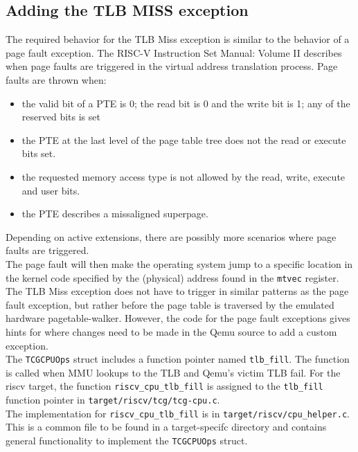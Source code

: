 \subsection{Adding the TLB MISS exception}
The required behavior for the TLB Miss exception is similar to the behavior of a page fault exception.
The RISC-V Instruction Set Manual: Volume II \cite{RISCVInstructionSetII} describes when page faults
are triggered in the virtual address translation process. Page faults are thrown when:
\begin{itemize}
    \item the valid bit of a PTE is 0; the read bit is 0 and the write bit is 1; any of the reserved
          bits is set
    \item the PTE at the last level of the page table tree does not the read or execute bits set.
    \item the requested memory access type is not allowed by the read, write, execute and user bits.
    \item the PTE describes a missaligned superpage.
\end{itemize}
Depending on active extensions, there are possibly more scenarios where page faults are triggered.\\
The page fault will then make the operating system jump to a specific location in the kernel code
specified by the (physical) address found in the \texttt{mtvec} register.\\
The TLB Miss exception does not have to trigger in similar patterns as the page fault exception, but rather
before the page table is traversed by the emulated hardware pagetable-walker.
However, the code for the page fault exceptions gives hints for where changes need to be made in the Qemu
source to add a custom exception.\\
The \texttt{TCGCPUOps} struct includes a function pointer named \texttt{tlb\_fill}. The function is called
when MMU lookups to the TLB and Qemu's victim TLB fail.
For the riscv target, the function \texttt{riscv\_cpu\_tlb\_fill} is assigned to the \texttt{tlb\_fill}
function pointer in \texttt{target/riscv/tcg/tcg-cpu.c}.\\
The implementation for \texttt{riscv\_cpu\_tlb\_fill} is in \texttt{target/riscv/cpu\_helper.c}. This is a common
file to be found in a target-specifc directory and contains general functionality to implement the \texttt{TCGCPUOps} struct.\\



